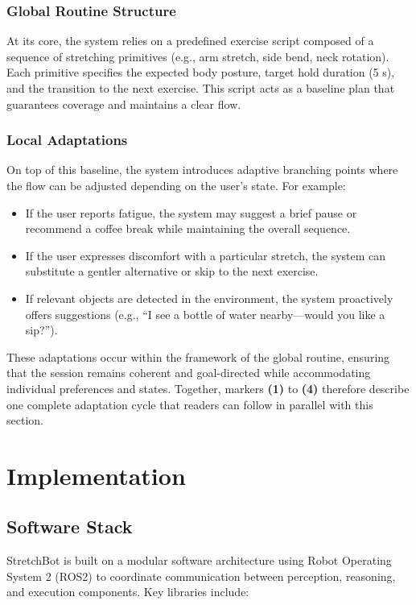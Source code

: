 \documentclass[pdflatex,sn-basic,Numbered,iicol,twocolumn]{sn-jnl}%
\begin{document}
\subsubsection{Global Routine Structure}
At its core, the system relies on a predefined exercise script composed of a sequence of stretching primitives (e.g., arm stretch, side bend, neck rotation). Each primitive specifies the expected body posture, target hold duration (5 s), and the transition to the next exercise. This script acts as a baseline plan that guarantees coverage and maintains a clear flow.

\subsubsection{Local Adaptations}
On top of this baseline, the system introduces adaptive branching points where the flow can be adjusted depending on the user's state. For example:

\begin{itemize}
\item If the user reports fatigue, the system may suggest a brief pause or recommend a coffee break while maintaining the overall sequence.
\item If the user expresses discomfort with a particular stretch, the system can substitute a gentler alternative or skip to the next exercise.
\item If relevant objects are detected in the environment, the system proactively offers suggestions (e.g., ``I see a bottle of water nearby—would you like a sip?'').
\end{itemize}

These adaptations occur within the framework of the global routine, ensuring that the session remains coherent and goal-directed while accommodating individual preferences and states. Together, markers \textbf{(1)} to \textbf{(4)} therefore describe one complete adaptation cycle that readers can follow in parallel with this section.
\section{Implementation}
\label{sec:implementation}

\subsection{Software Stack}

StretchBot is built on a modular software architecture using Robot Operating System 2 (ROS2) to coordinate communication between perception, reasoning, and execution components. Key libraries include:
\end{document}
